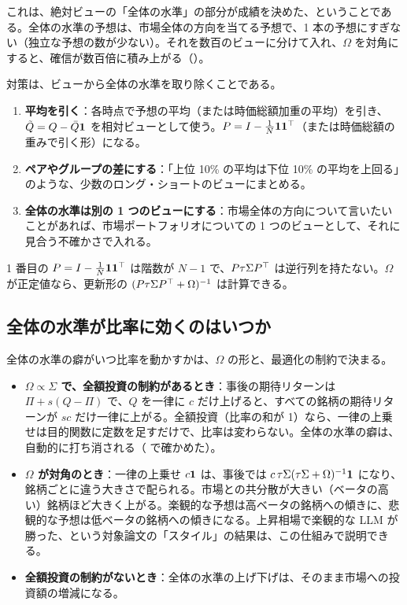 これは、絶対ビューの「全体の水準」の部分が成績を決めた、ということである。全体の水準の予想は、市場全体の方向を当てる予想で、1 本の予想にすぎない（独立な予想の数が少ない）。それを数百のビューに分けて入れ、$\Omega$ を対角にすると、確信が数百倍に積み上がる（）。

対策は、ビューから全体の水準を取り除くことである。

\begin{enumerate}
\item \textbf{平均を引く}：各時点で予想の平均（または時価総額加重の平均）を引き、$\tilde Q=Q-\bar Q\mathbf{1}$ を相対ビューとして使う。$P=I-\frac1N\mathbf{1}\mathbf{1}^{\top}$（または時価総額の重みで引く形）になる。
\item \textbf{ペアやグループの差にする}：「上位 10\% の平均は下位 10\% の平均を上回る」のような、少数のロング・ショートのビューにまとめる。
\item \textbf{全体の水準は別の 1 つのビューにする}：市場全体の方向について言いたいことがあれば、市場ポートフォリオについての 1 つのビューとして、それに見合う不確かさで入れる。
\end{enumerate}

1 番目の $P=I-\frac1N\mathbf{1}\mathbf{1}^{\top}$ は階数が $N-1$ で、$P\tau\Sigma P^{\top}$ は逆行列を持たない。$\Omega$ が正定値なら、更新形の $(P\tau\Sigma P^{\top}+\Omega)^{-1}$ は計算できる。

\subsection*{全体の水準が比率に効くのはいつか}

全体の水準の癖がいつ比率を動かすかは、$\Omega$ の形と、最適化の制約で決まる。

\begin{itemize}
\item \textbf{$\Omega\propto\Sigma$ で、全額投資の制約があるとき}：事後の期待リターンは $\Pi+s(Q-\Pi)$ で、$Q$ を一律に $c$ だけ上げると、すべての銘柄の期待リターンが $sc$ だけ一律に上がる。全額投資（比率の和が 1）なら、一律の上乗せは目的関数に定数を足すだけで、比率は変わらない。全体の水準の癖は、自動的に打ち消される（ で確かめた）。
\item \textbf{$\Omega$ が対角のとき}：一律の上乗せ $c\mathbf{1}$ は、事後では $c\,\tau\Sigma(\tau\Sigma+\Omega)^{-1}\mathbf{1}$ になり、銘柄ごとに違う大きさで配られる。市場との共分散が大きい（ベータの高い）銘柄ほど大きく上がる。楽観的な予想は高ベータの銘柄への傾きに、悲観的な予想は低ベータの銘柄への傾きになる。上昇相場で楽観的な LLM が勝った、という対象論文の「スタイル」の結果は、この仕組みで説明できる。
\item \textbf{全額投資の制約がないとき}：全体の水準の上げ下げは、そのまま市場への投資額の増減になる。
\end{itemize}

